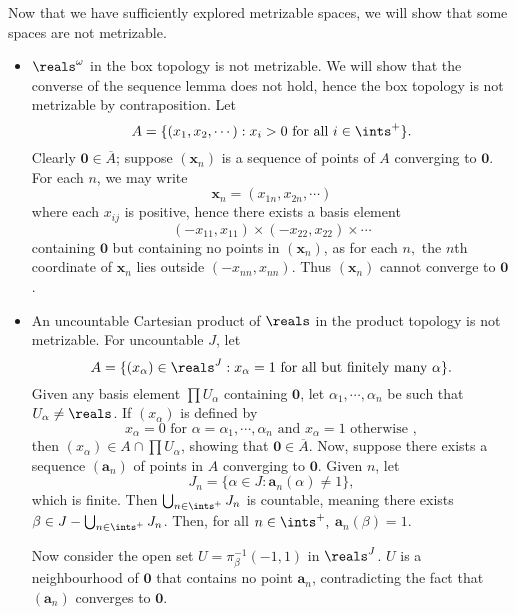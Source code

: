 Now that we have sufficiently explored metrizable spaces, we will show that some spaces are not metrizable.
\begin{itemize}
    \item $\reals^\omega$ in the box topology is not metrizable. We will show that the converse of the sequence lemma does not hold, hence the box topology is not metrizable by contraposition. Let
    $$A = \{(x_1, x_2, \cdots) : x_i > 0 \text{ for all } i \in \ints^+\}.$$
    Clearly $\mathbf{0} \in \overline{A}$; suppose $(\mathbf{x}_n)$ is a sequence of points of $A$ converging to $\mathbf{0}$. For each $n$, we may write
    $$\mathbf{x}_n = (x_{1n}, x_{2n}, \cdots)$$
    where each $x_{ij}$ is positive, hence there exists a basis element
    $$(-x_{11}, x_{11}) \times (-x_{22}, x_{22}) \times \cdots$$
    containing $\mathbf{0}$ but containing no points in $(\mathbf{x}_n)$, as for each $n,$ the $n$th coordinate of $\mathbf{x}_n$ lies outside $(-x_{nn}, x_{nn})$. Thus $(\mathbf{x}_n)$ cannot converge to $\mathbf{0}$.

    \item An uncountable Cartesian product of $\reals$ in the product topology is not metrizable. For uncountable $J$, let
    $$A = \{(x_\alpha) \in \reals^J: x_\alpha = 1 \text{ for all but finitely many } \alpha \}.$$
    Given any basis element $\prod U_\alpha$ containing $\mathbf{0}$, let $\alpha_1, \cdots, \alpha_n$ be such that $U_\alpha \neq \reals$. If $(x_\alpha)$ is defined by
    $$x_\alpha = 0 \text{ for } \alpha = \alpha_1, \cdots, \alpha_n \text{ and } x_\alpha = 1 \text{ otherwise },$$
    then $(x_\alpha) \in A \cap \prod U_\alpha$, showing that $\mathbf{0} \in \overline{A}$. Now, suppose there exists a sequence $(\mathbf{a}_n)$ of points in $A$ converging to $\mathbf{0}$. Given $n$, let
    $$J_n = \{\alpha \in J: \mathbf{a}_n (\alpha) \neq 1\},$$
    which is finite. Then $\bigcup_{n \in \ints^+} J_n$ is countable, meaning there exists $\beta \in J - \bigcup_{n \in \ints^+} J_n$. Then, for all $n \in \ints^+,$ $\mathbf{a}_n (\beta) = 1$.

    Now consider the open set $U = \pi_\beta^{-1}(-1, 1)$ in $\reals^J$. $U$ is a neighbourhood of $\mathbf{0}$ that contains no point $\mathbf{a}_n$, contradicting the fact that $(\mathbf{a}_n)$ converges to $\mathbf{0}$.
\end{itemize}

